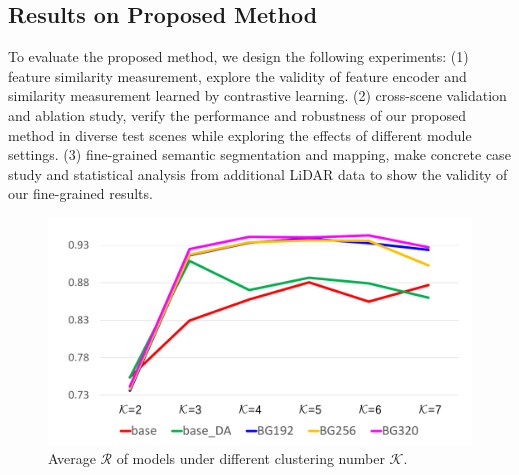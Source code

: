 \documentclass[letterpaper, 10 pt, conference]{ieeeconf}  %
\begin{document}
	\subsection{Results on Proposed Method}
	To evaluate the proposed method, we design the following experiments: (1) feature similarity measurement, explore the validity of feature encoder and similarity measurement learned by contrastive learning. (2) cross-scene validation and ablation study, verify the performance and robustness of our proposed method in diverse test scenes while exploring the effects of different module settings. (3) fine-grained semantic segmentation and mapping, make concrete case study and statistical analysis from additional LiDAR data to show the validity of our fine-grained results.
	
	
	\begin{figure}[]
		\centering
		\includegraphics[scale=0.25]{kmeans_exp.pdf}
		\caption{Average $\mathcal{R}$ of models under different clustering number $\mathcal{K}$.}
		\label{fig:kmeans_exp}
	\end{figure}
	
\end{document}
